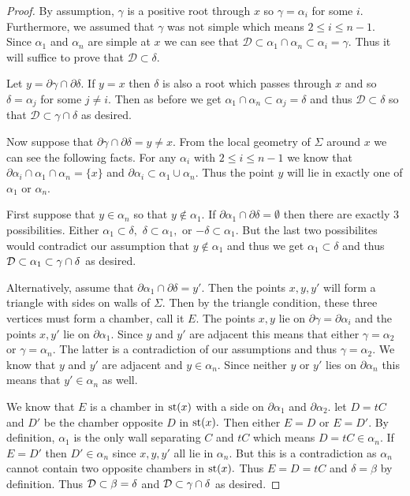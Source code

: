 \documentclass[class=book, crop=false,12 pt]{standalone}
\begin{document}
\begin{proof}
	By assumption, $\gamma$ is a positive root through $x$ so $\gamma=\alpha_i$ for some $i.$ Furthermore, we assumed that $\gamma$ was not simple which means $2\le i \le n-1.$ Since $\alpha_1$ and $\alpha_n$ are simple at $x$ we can see that $\mathcal{D}\subset \alpha_1\cap \alpha_n\subset \alpha_i=\gamma.$ Thus it will suffice to prove that $\mathcal{D}\subset \delta.$

	Let $y=\partial\gamma \cap \partial \delta.$ If $y=x$ then $\delta$ is also a root which passes through $x$ and so $\delta=\alpha_j$ for some $j\neq i.$ Then as before we get $\alpha_1\cap \alpha_n\subset \alpha_j=\delta$ and thus $\mathcal{D}\subset \delta$ so that $\mathcal{D}\subset \gamma\cap \delta$ as desired.

	Now suppose that $\partial \gamma\cap \partial \delta=y\neq x.$ From the local geometry of $\Sigma$ around $x$ we can see the following facts. For any $\alpha_i$ with $2\le i\le n-1$ we know that $\partial\alpha_i\cap \alpha_1\cap \alpha_n=\{x\}$ and $\partial\alpha_i\subset \alpha_1\cup\alpha_n.$ Thus the point $y$ will lie in exactly one of $\alpha_1$ or $\alpha_n.$

	First suppose that $y\in \alpha_n$ so that $y\not\in \alpha_1.$ If $\partial\alpha_1\cap \partial\delta=\emptyset$ then there are exactly 3 possibilities. Either $\alpha_1\subset \delta,$ $\delta\subset\alpha_1,$ or $-\delta\subset \alpha_1.$ But the last two possibilites would contradict our assumption that $y\not\in \alpha_1$ and thus we get $\alpha_1\subset \delta$ and thus $\mathcal{D}\subset \alpha_1\subset \gamma\cap\delta$ as desired.

	Alternatively, assume that $\partial\alpha_1\cap \partial\delta=y'.$ Then the points $x,y,y'$ will form a triangle with sides on walls of $\Sigma.$ Then by the triangle condition, these three vertices must form a chamber, call it $E.$ The points $x,y$ lie on $\partial\gamma=\partial\alpha_i$ and the points $x,y'$ lie on $\partial\alpha_1.$ Since $y$ and $y'$ are adjacent this means that either $\gamma=\alpha_2$ or $\gamma=\alpha_n.$ The latter is a contradiction of our assumptions and thus $\gamma=\alpha_2.$ We know that $y$ and $y'$ are adjacent and $y\in \alpha_n.$ Since neither $y$ or $y'$ lies on $\partial\alpha_n$ this means that $y'\in \alpha_n$ as well.

	We know that $E$ is a chamber in $\mathrm{st}(x)$ with a side on $\partial \alpha_1$ and $\partial\alpha_2.$ let $D=tC$ and $D'$ be the chamber opposite $D$ in $\mathrm{st}(x).$ Then either $E=D$ or $E=D'.$ By definition, $\alpha_1$ is the only wall separating $C$ and $tC$ which means $D=tC\in \alpha_n.$ If $E=D'$ then $D'\in \alpha_n$ since $x,y,y'$ all lie in $\alpha_n.$ But this is a contradiction as $\alpha_n$ cannot contain two opposite chambers in $\mathrm{st}(x).$ Thus $E=D=tC$ and $\delta=\beta$ by definition. Thus $\mathcal{D}\subset \beta=\delta$ and $\mathcal{D}\subset \gamma\cap \delta$ as desired.


\end{proof}
\end{document}
